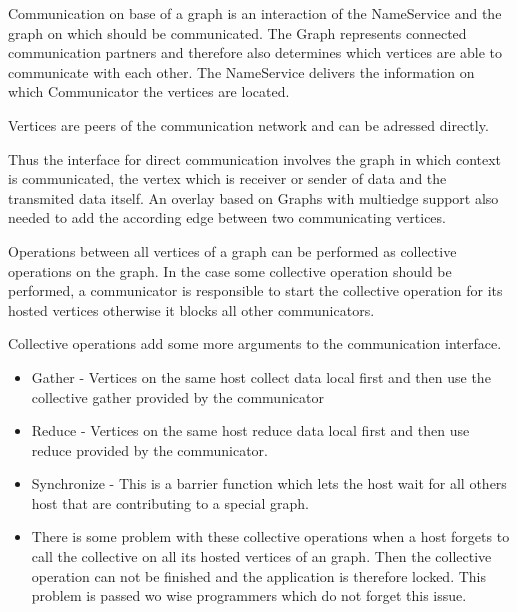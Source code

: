 Communication on base of a graph is an interaction of the NameService
and the graph on which should be communicated. The Graph represents
connected communication partners and therefore also determines which
vertices are able to communicate with each other. The NameService
delivers the information on which Communicator the vertices are
located.

Vertices are peers of the communication network and can be adressed
directly.

Thus the interface for direct communication involves the graph in
which context is communicated, the vertex which is receiver or sender
of data and the transmited data itself. An overlay based on Graphs
with multiedge support also needed to add the according edge between
two communicating vertices.

Operations between all vertices of a graph can be performed as
collective operations on the graph.  In the case some collective
operation should be performed, a communicator is responsible to start
the collective operation for its hosted vertices otherwise it blocks
all other communicators.

Collective operations add some more arguments to the communication
interface.

\begin{itemize}
\item Gather - Vertices on the same host collect data local first and
  then use the collective gather provided by the communicator
\item Reduce - Vertices on the same host reduce data local first and
  then use reduce provided by the communicator.
\item Synchronize - This is a barrier function which lets the host
  wait for all others host that are contributing to a special graph.
\item There is some problem with these collective operations when a
  host forgets to call the collective on all its hosted vertices of an
  graph.  Then the collective operation can not be finished and the
  application is therefore locked. This problem is passed wo wise
  programmers which do not forget this issue.
\end{itemize}




